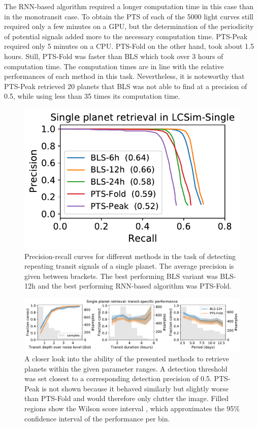The RNN-based algorithm required a longer computation time in this case than in the monotransit case. To obtain the PTS of each of the 5000 light curves still required only a few minutes on a GPU, but the determination of the periodicity of potential signals added more to the necessary computation time. PTS-Peak required only 5 minutes on a CPU. PTS-Fold on the other hand, took about 1.5 hours. Still, PTS-Fold was faster than BLS which took over 3 hours of computation time. The computation times are in line with the relative performances of each method in this task. Nevertheless, it is noteworthy that PTS-Peak retrieved 20 planets that BLS was not able to find at a precision of 0.5, while using less than 35 times its computation time.


\begin{figure}
    \centering
    \includegraphics[width=0.35\linewidth]{Experiments/Figures/Singles/single_pr.pdf}
    \caption{Precision-recall curves for different methods in the task of detecting repeating transit signals of a single planet. The average precision is given between brackets. The best performing BLS variant was BLS-12h and the best performing RNN-based algorithm was PTS-Fold.}
    \label{fig:single_pr}
\end{figure}


\begin{figure}
    \centering
    \includegraphics[width=\linewidth]{Experiments/Figures/Singles/single_transit_specific.pdf}
    \caption{A closer look into the ability of the presented methods to retrieve planets within the given parameter ranges. A detection threshold was set closest to a corresponding detection precision of 0.5. PTS-Peak is not shown because it behaved similarly but slightly worse than PTS-Fold and would therefore only clutter the image. Filled regions show the Wilson score interval \citep{wilson1927probable}, which approximates the 95\% confidence interval of the performance per bin.}
    \label{fig:single_transit}
\end{figure}



